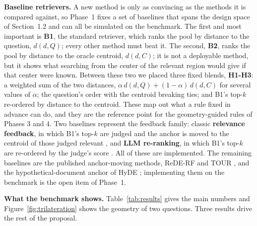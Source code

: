 \documentclass[12pt,a4paper]{article}
\newcommand{\dist}{d}
\begin{document}
\textbf{Baseline retrievers.} A new method is only as convincing as the methods it is compared against, so Phase~1 fixes a set of baselines that spans the design space of Section~1.2 and can all be simulated on the benchmark. The first and most important is \textbf{B1}, the standard retriever, which ranks the pool by distance to the question, $\dist(d,Q)$; every other method must beat it. The second, \textbf{B2}, ranks the pool by distance to the oracle centroid, $\dist(d,C)$; it is not a deployable method, but it shows what searching from the center of the relevant region would give if that center were known. Between these two we placed three fixed blends, \textbf{H1-H3}: a weighted sum of the two distances, $\alpha\,\dist(d,Q)+(1-\alpha)\,\dist(d,C)$ for several values of $\alpha$; the question's order with the centroid breaking ties; and B1's top-$k$ re-ordered by distance to the centroid. These map out what a rule fixed in advance can do, and they are the reference point for the geometry-guided rules of Phases 3 and 4. Two baselines represent the feedback family: classic \textbf{relevance feedback}, in which B1's top-$k$ are judged and the anchor is moved to the centroid of those judged relevant \citep{li2023vectorprf}, and \textbf{LLM re-ranking}, in which B1's top-$k$ are re-ordered by the judge's score \citep{sun2023rankgpt}. All of these are implemented. The remaining baselines are the published anchor-moving methods, ReDE-RF \citep{jataria2024rederf} and TOUR \citep{sung2023tour}, and the hypothetical-document anchor of HyDE \citep{gao2023hyde}; implementing them on the benchmark is the open item of Phase~1.

\textbf{What the benchmark shows.} Table~\ref{tab:results} gives the main numbers and Figure~\ref{fig:trilateration} shows the geometry of two questions. Three results drive the rest of the proposal.
\end{document}
